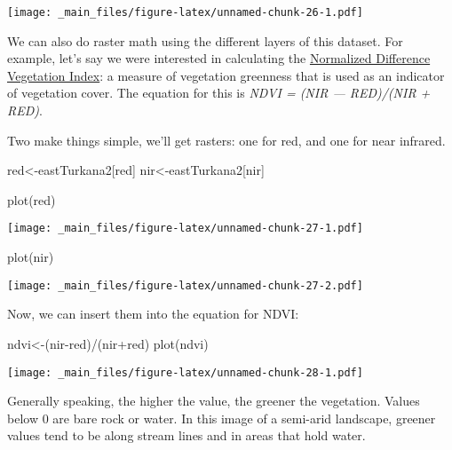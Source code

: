 \documentclass[
]{book}
\newenvironment{Shaded}{\begin{snugshade}}{\end{snugshade}}
\newcommand{\FunctionTok}[1]{\textcolor[rgb]{0.00,0.00,0.00}{#1}}
\newcommand{\NormalTok}[1]{#1}
\newcommand{\OtherTok}[1]{\textcolor[rgb]{0.56,0.35,0.01}{#1}}
\newcommand{\SpecialCharTok}[1]{\textcolor[rgb]{0.00,0.00,0.00}{#1}}
\newcommand{\StringTok}[1]{\textcolor[rgb]{0.31,0.60,0.02}{#1}}
\begin{document}
\texttt{[image: \_main\_files/figure-latex/unnamed-chunk-26-1.pdf]}

We can also do raster math using the different layers of this dataset. For example, let's say we were interested in calculating the \href{https://gisgeography.com/ndvi-normalized-difference-vegetation-index/}{Normalized Difference Vegetation Index}: a measure of vegetation greenness that is used as an indicator of vegetation cover. The equation for this is \emph{NDVI = (NIR --- RED)/(NIR + RED)}.

Two make things simple, we'll get rasters: one for red, and one for near infrared.

\begin{Shaded}
\begin{Highlighting}[]
\NormalTok{red}\OtherTok{\textless{}{-}}\NormalTok{eastTurkana2[}\StringTok{\textquotesingle{}red\textquotesingle{}}\NormalTok{]}
\NormalTok{nir}\OtherTok{\textless{}{-}}\NormalTok{eastTurkana2[}\StringTok{\textquotesingle{}nir\textquotesingle{}}\NormalTok{]}

\FunctionTok{plot}\NormalTok{(red)}
\end{Highlighting}
\end{Shaded}

\texttt{[image: \_main\_files/figure-latex/unnamed-chunk-27-1.pdf]}

\begin{Shaded}
\begin{Highlighting}[]
\FunctionTok{plot}\NormalTok{(nir)}
\end{Highlighting}
\end{Shaded}

\texttt{[image: \_main\_files/figure-latex/unnamed-chunk-27-2.pdf]}

Now, we can insert them into the equation for NDVI:

\begin{Shaded}
\begin{Highlighting}[]
\NormalTok{ndvi}\OtherTok{\textless{}{-}}\NormalTok{(nir}\SpecialCharTok{{-}}\NormalTok{red)}\SpecialCharTok{/}\NormalTok{(nir}\SpecialCharTok{+}\NormalTok{red)}
\FunctionTok{plot}\NormalTok{(ndvi)}
\end{Highlighting}
\end{Shaded}

\texttt{[image: \_main\_files/figure-latex/unnamed-chunk-28-1.pdf]}

Generally speaking, the higher the value, the greener the vegetation. Values below 0 are bare rock or water. In this image of a semi-arid landscape, greener values tend to be along stream lines and in areas that hold water.
\end{document}
